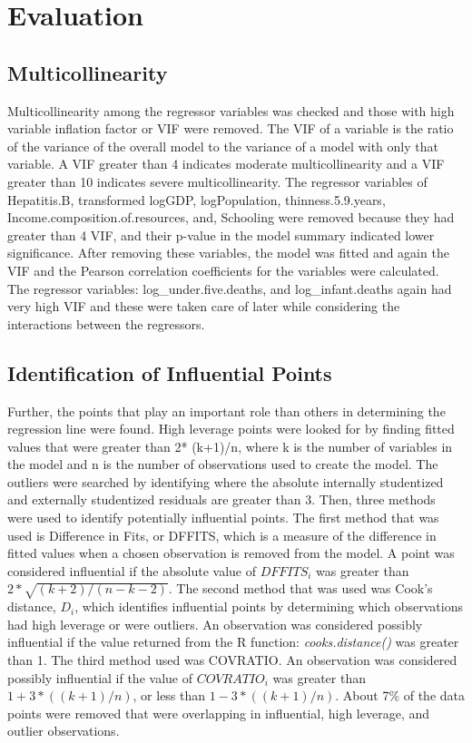 \section{Evaluation}
\label{sec:evaluation}

\subsection{Multicollinearity}
\label{sec:multicollinearity}
Multicollinearity among the regressor variables was checked and those with high variable inflation factor or VIF were removed. The VIF of a variable is the ratio of the variance of the overall model to the variance of a model with only that variable. A VIF greater than 4 indicates moderate multicollinearity and a VIF greater than 10 indicates severe multicollinearity. The regressor variables of Hepatitis.B, transformed logGDP, logPopulation, thinness.5.9.years, Income.composition.of.resources, and, Schooling were removed because they had greater than 4 VIF, and their p-value in the model summary indicated lower significance. 
After removing these variables, the model was fitted and again the VIF and the Pearson correlation coefficients for the variables were calculated. The regressor variables: log\_under.five.deaths, and log\_infant.deaths again had very high VIF and these were taken care of later while considering the interactions between the regressors.

\subsection{Identification of Influential Points}
\label{sec:influential-points}
Further, the points that play an important role than others in determining the regression line were found. High leverage points were looked for by finding fitted values that were greater than 2* (k+1)/n, where k is the number of variables in the model and n is the number of observations used to create the model. The outliers were searched by identifying where the absolute internally studentized and externally studentized residuals are greater than 3. Then, three methods were used to identify potentially influential points. The first method that was used is Difference in Fits, or DFFITS, which is a measure of the difference in fitted values when a chosen observation is removed from the model. A point was considered influential if the absolute value of $DFFITS_i$ was greater than $2* \sqrt{(k+2)/(n-k-2)}$. The second method that was used was Cook’s distance, $D_i$, which identifies influential points by determining which observations had high leverage or were outliers. An observation was considered possibly influential if the value returned from the R function: \textit{cooks.distance()} was greater than 1. The third method used was COVRATIO. An observation was considered possibly influential if the value of $COVRATIO_i$ was greater than $1+ 3*((k+1)/n)$, or less than $1- 3*((k+1)/n)$.
About 7\% of the data points were removed that were overlapping in influential, high leverage, and outlier observations.

